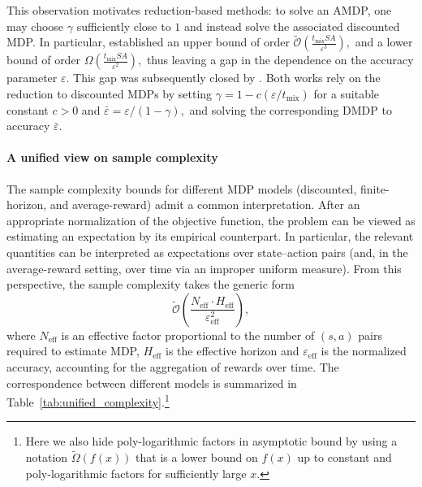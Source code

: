 \documentclass{article}
\numberwithin{equation}{section}
\begin{document}
This observation motivates reduction-based methods: to solve an AMDP, one may choose $\gamma$ sufficiently close to $1$ and instead solve the associated discounted MDP. In particular, \cite{sidford2018near} established an upper bound of order 
\(\widetilde{\mathcal{O}}\!\left(\frac{t_{\operatorname{mix}}SA}{{\varepsilon^{3}}}\right),
\)
and a lower bound of order 
\(\Omega\!\left(\frac{t_{\operatorname{mix}}SA}{{\varepsilon^{2}}}\right),
\)
thus leaving a gap in the dependence on the accuracy parameter $\varepsilon$. This gap was subsequently closed by \citet{wang2024optimal}. Both works rely on the reduction to discounted MDPs by setting 
\(
\gamma = 1 - c(\varepsilon/{t_{\mathrm{mix}}})\) for a suitable constant \(c>0\)
and \(
\bar{\varepsilon} = {\varepsilon}/({1-\gamma}),
\)
and solving the corresponding DMDP to accuracy $\bar{\varepsilon}$.

\paragraph{A unified view on sample complexity}
The sample complexity bounds for different MDP models (discounted, finite-horizon,
and average-reward) admit a common interpretation.
After an appropriate normalization of the objective function, the problem can be
viewed as estimating an expectation by its empirical counterpart. In particular,
the relevant quantities can be interpreted as expectations over state--action pairs
(and, in the average-reward setting, over time via an improper uniform measure).
From this perspective, the sample complexity takes the generic form
\[
\widetilde{\mathcal{O}}\!\left(
\frac{N_{\mathrm{eff}} \cdot H_{\mathrm{eff}}}{\varepsilon_{\mathrm{eff}}^2}
\right),
\]
where \(N_{\mathrm{eff}}\) is an effective factor proportional to the number of $(s, a)$ pairs required to estimate MDP, \(H_{\mathrm{eff}}\) is the effective horizon and
\(\varepsilon_{\mathrm{eff}}\) is the normalized accuracy, accounting for the
aggregation of rewards over time.
The correspondence between different models is summarized in Table~\ref{tab:unified_complexity}.\footnote{Here we also hide poly-logarithmic factors in asymptotic bound by using a notation $\widetilde{\Omega}(f(x))$ that is a lower bound on $f(x)$ up to constant and poly-logarithmic factors for sufficiently large $x$.}
\end{document}
